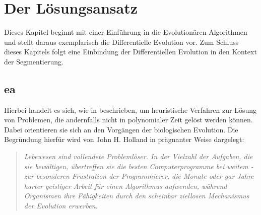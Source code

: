 \chapter{Der Lösungsansatz}
\label{chap:sol}

	Dieses Kapitel beginnt mit einer Einführung in die Evolutionären Algorithmen und stellt daraus exemplarisch die Differentielle Evolution vor. Zum Schluss dieses Kapitels folgt eine Einbindung der Differentiellen Evolution in den Kontext der Segmentierung.

	\section{\gls{ea}}
	\label{sec:evol}
	
		Hierbei handelt es sich, wie in \cite{ea-intro} beschrieben, um heuristische Verfahren zur Lösung von Problemen, die andernfalls nicht in polynomialer Zeit gelöst werden können. Dabei orientieren sie sich an den Vorgängen der biologischen Evolution. Die Begründung hierfür wird von John H. Holland \cite{j-h-holland} in prägnanter Weise dargelegt: 
	
		\begin{quote}
			\textit{Lebewesen sind vollendete Problemlöser. In der Vielzahl der Aufgaben, die sie bewältigen, übertreffen sie die besten Computerprogramme bei weitem - zur besonderen Frustration der Programmierer, die Monate oder gar Jahre harter geistiger Arbeit für einen Algorithmus aufwenden, während Organismen ihre Fähigkeiten durch den scheinbar ziellosen Mechanismus der Evolution erwerben.}
		\end{quote}
	
